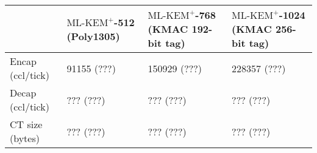 \documentclass[journal=tches,submission]{iacrtrans}
\def\mlkemplus{\text{ML-KEM}^+}
\begin{document}
\begin{table}[h]
    \centering
    \footnotesize

    \begin{tabular}{|p{1.2cm}|p{2.1cm}|p{2.6cm}|p{2.7cm}|}
        \hline
        & $\mlkemplus$-512 \newline (Poly1305)
        & $\mlkemplus$-768 \newline (KMAC 192-bit tag)
        & $\mlkemplus$-1024 \newline (KMAC 256-bit tag)
        \\
        \hline
        Encap \newline (ccl/tick) 
        & 91155 \newline (???) 
        & 150929 \newline (???) 
        & 228357 \newline (???) 
        \\
        \hline
        Decap \newline (ccl/tick) 
        & ??? \newline (???) 
        & ??? \newline (???) 
        & ??? \newline (???) 
        \\
        \hline
        CT size \newline (bytes) 
        & ??? \newline (???) 
        & ??? \newline (???) 
        & ??? \newline (???) 
        \\
        \hline
    \end{tabular}


\end{table}
\end{document}
